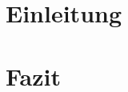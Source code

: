 \documentclass[a4paper, 12pt]{article}
\begin{document}
    
    
    
    

    \section{Einleitung}
    


    \section{Fazit}
    
    \pagebreak

    
    \pagebreak

    \appendix
\end{document}
